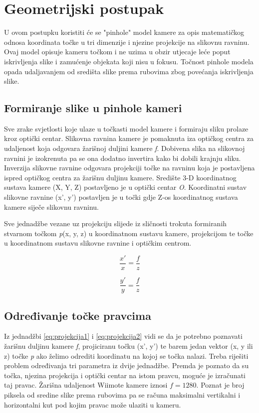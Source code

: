\documentclass[times, utf8, diplomski]{fer}
\begin{document}
\section{Geometrijski postupak}
U ovom postupku koristiti će se "pinhole" model kamere za opis matematičkog odnosa koordinata točke u tri dimenzije i njezine projekcije na slikovnu ravninu. Ovaj model opisuje kameru točkom i ne uzima u obzir utjecaje leće poput iskrivljenja slike i zamućenje objekata koji nisu u fokusu. Točnost pinhole modela opada udaljavanjem od središta slike prema rubovima zbog povećanja iskrivljenja slike.

\subsection{Formiranje slike u pinhole kameri}
Sve zrake svjetlosti koje ulaze u točkasti model kamere i formiraju sliku prolaze kroz optički centar. Slikovna ravnina kamere je pomaknuta iza optičkog centra za udaljenost koja odgovara žarišnoj duljini kamere \textit{f}. Dobivena slika na slikovnoj ravnini je izokrenuta pa se ona dodatno invertira kako bi dobili krajnju sliku. Inverzija slikovne ravnine odgovara projekciji točke na ravninu koja je postavljena ispred optičkog centra za žarišnu duljinu kamere. Središte 3-D koordinatnog sustava kamere (X, Y, Z) postavljeno je u optički centar \textit{O}. Koordinatni sustav slikovne ravnine (x', y') postavljen je u točki gdje Z-os koordinatnog sustava kamere siječe slikovnu ravninu.

Sve jednadžbe vezane uz projekciju slijede iz sličnosti trokuta formiranih stvarnom točkom \textit{p}(x, y, z) u koordinatnom sustavu kamere, projekcijom te točke u koordinatnom sustavu slikovne ravnine i optičkim centrom.

\begin{equation}
\frac{x'}{x} = \frac{f}{z}
\label{eq:projekcija1}
\end{equation}

\begin{equation}
\frac{y'}{y} = \frac{f}{z}
\label{eq:projekcija2}
\end{equation}

\subsection{Određivanje točke pravcima}
Iz jednadžbi \ref{eq:projekcija1} i \ref{eq:projekcija2} vidi se da je potrebno poznavati žarišnu duljinu kamere \textit{f}, projiciranu točku (x', y') te barem jedan vektor (x, y ili z) točke \textit{p} ako želimo odrediti koordinatu na kojoj se točka nalazi. Treba riješiti problem određivanja tri parametra iz dvije jednadžbe. Premda je poznato da su točka, njezina projekcija i optički centar na istom pravcu, moguće je izračunati taj pravac. Žarišna udaljenost Wiimote kamere iznosi $f=1280$. Poznat je broj piksela od sredine slike prema rubovima pa se računa maksimalni vertikalni i horizontalni kut pod kojim pravac može ulaziti u kameru.
\end{document}
